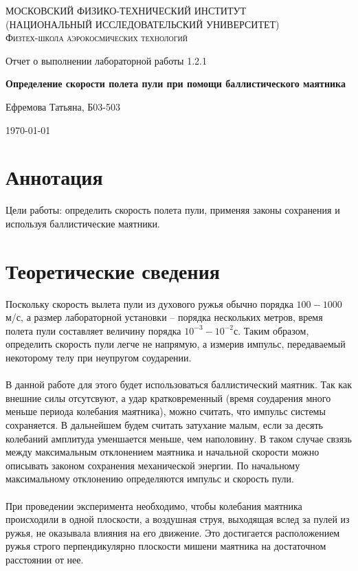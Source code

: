 \documentclass[a4paper]{article}
\begin{document}
\begin{titlepage}
	\centering
	{\scshape\Large МОСКОВСКИЙ ФИЗИКО-ТЕХНИЧЕСКИЙ ИНСТИТУТ \\
	(НАЦИОНАЛЬНЫЙ ИССЛЕДОВАТЕЛЬСКИЙ УНИВЕРСИТЕТ)\\ %
    Физтех-школа аэрокосмических технологий}
	
	\vspace{4cm} %
	{\LARGE Отчет о выполнении лабораторной работы 1.2.1}
	
	\vspace{1cm} %
	{\huge\bf Определение скорости полета пули при помощи баллистического маятника}
	
	\vspace{1cm} %
	\vfill %
	
    \begin{flushright} %
	   {\LARGE Ефремова Татьяна, Б03-503}
    \end{flushright}
    \vfill

	\today %
\end{titlepage}

\section{Аннотация}
Цели работы: определить скорость полета пули, применяя законы сохранения и используя баллистические маятники.

\section{Теоретические сведения}
Поскольку скорость вылета пули из духового ружья обычно порядка $100 - 1000$ м/с, а размер лабораторной установки -- порядка нескольких метров, время полета пули составляет величину порядка $10^{-3}-10^{-2}$с. Таким образом, определить скорость пули легче не напрямую, а измерив импульс, передаваемый некоторому телу при неупругом соударении. \\ \\
В данной работе для этого будет использоваться баллистический маятник. Так как внешние силы отсутсвуют, а удар кратковременный (время соударения много меньше периода колебания маятника), можно считать, что импульс системы сохраняется. В дальнейшем будем считать затухание малым, если за десять колебаний амплитуда уменшается меньше, чем наполовину. В таком случае свзязь между максимальным отклонением маятника и начальной скорости можно описывать законом сохранения механической энергии. По начальному максимальному отклонению определяются импульс и скорость пули. \\ \\
При проведении эксперимента необходимо, чтобы колебания маятника происходили в одной плоскости, а воздушная струя, выходящая вслед за пулей из ружья, не оказывала влияния на его движение. Это достигается расположением ружья строго перпендикулярно плоскости мишени маятника на достаточном расстоянии от нее.
\end{document}

